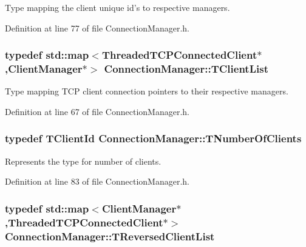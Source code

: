 Type mapping the client unique id's to respective managers. 



Definition at line 77 of file Connection\-Manager.\-h.

\hypertarget{class_connection_manager_a7b6865543285e3b27b981a739fd0db18}{
\subsubsection[{T\-Client\-List}]{\setlength{\rightskip}{0pt plus 5cm}typedef std\-::map$<${\bf Threaded\-T\-C\-P\-Connected\-Client}$\ast$,{\bf Client\-Manager}$\ast$$>$ {\bf Connection\-Manager\-::\-T\-Client\-List}\hspace{0.3cm}{\ttfamily [private]}}}\label{class_connection_manager_a7b6865543285e3b27b981a739fd0db18}


Type mapping T\-C\-P client connection pointers to their respective managers. 



Definition at line 67 of file Connection\-Manager.\-h.

\hypertarget{class_connection_manager_a0f5f5b25b063cfebfac54b25cda131f7}{
\subsubsection[{T\-Number\-Of\-Clients}]{\setlength{\rightskip}{0pt plus 5cm}typedef {\bf T\-Client\-Id} {\bf Connection\-Manager\-::\-T\-Number\-Of\-Clients}}}\label{class_connection_manager_a0f5f5b25b063cfebfac54b25cda131f7}


Represents the type for number of clients. 



Definition at line 83 of file Connection\-Manager.\-h.

\hypertarget{class_connection_manager_aa35cf836145608197dbe4201b115991c}{
\subsubsection[{T\-Reversed\-Client\-List}]{\setlength{\rightskip}{0pt plus 5cm}typedef std\-::map$<${\bf Client\-Manager}$\ast$,{\bf Threaded\-T\-C\-P\-Connected\-Client}$\ast$$>$ {\bf Connection\-Manager\-::\-T\-Reversed\-Client\-List}\hspace{0.3cm}{\ttfamily [private]}}}\label{class_connection_manager_aa35cf836145608197dbe4201b115991c}


